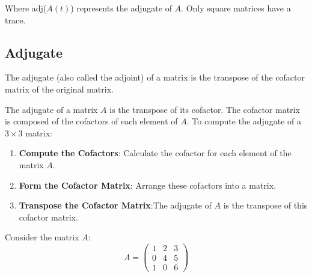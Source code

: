 \documentclass[12pt]{article}
\begin{document}
Where adj(\(A(t)\)) represents the adjugate of \(A\). Only square matrices have a trace.

\subsection{Adjugate}
The adjugate (also called the adjoint) of a matrix is the transpose of the cofactor matrix of the original matrix.

The adjugate of a matrix \( A \) is the transpose of its cofactor. The cofactor matrix is composed of the cofactors of each element of \( A \). To compute the adjugate of a \(3 \times 3\) matrix:

\begin{enumerate}
\item \textbf{Compute the Cofactors}: Calculate the cofactor for each element of the matrix \( A \).
\item \textbf{Form the Cofactor Matrix}: Arrange these cofactors into a matrix.
\item \textbf{Transpose the Cofactor Matrix}:The adjugate of \( A \) is the transpose of this cofactor matrix.
\end{enumerate}


Consider the matrix \( A \):
\[ A = \begin{pmatrix} 1 & 2 & 3 \\ 0 & 4 & 5 \\ 1 & 0 & 6 \end{pmatrix} \]
\end{document}
